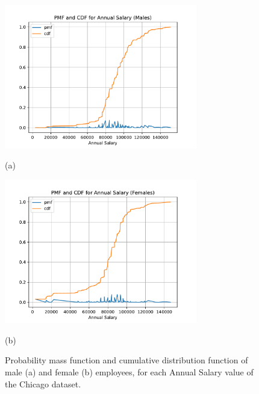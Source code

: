 \begin{itemize}
\begin{figure}[h!]
\centering
\includegraphics[width=0.75\textwidth]{figures/Chicago_pmf_cdf_annual_salary_males.pdf}
\caption*{(a)}
\includegraphics[width=0.75\textwidth]{figures/Chicago_pmf_cdf_annual_salary_females.pdf}
\caption*{(b)}
\caption{Probability mass function and cumulative distribution function of male (a) and female (b) employees, for each \textrm{Annual Salary} value of the Chicago dataset.}
\label{fig:chicago_fair-db3}
\end{figure}


\end{itemize}
